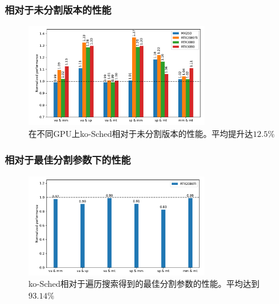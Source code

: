 \documentclass[aspectratio=169]{ctexbeamer}
\begin{document}
\begin{frame}
  \frametitle{相对于未分割版本的性能}

  \scriptsize{\begin{center}
    \begin{figure}
      \includegraphics[width=0.7\textwidth]{figures/perf-eval-diff-dev.pdf}
      \caption{在不同GPU上ko-Sched相对于未分割版本的性能。平均提升达$12.5\%$}
    \end{figure}
  \end{center}}
\end{frame}

\begin{frame}
  \frametitle{相对于最佳分割参数下的性能}

  \scriptsize{\begin{center}
    \begin{figure}
      \includegraphics[width=0.7\textwidth]{figures/perf-eval-compared-to-opt.pdf}
      \caption{ko-Sched相对于遍历搜索得到的最佳分割参数的性能。平均达到$ 93.14\%$}
    \end{figure}
  \end{center}}

\end{frame}
\end{document}
